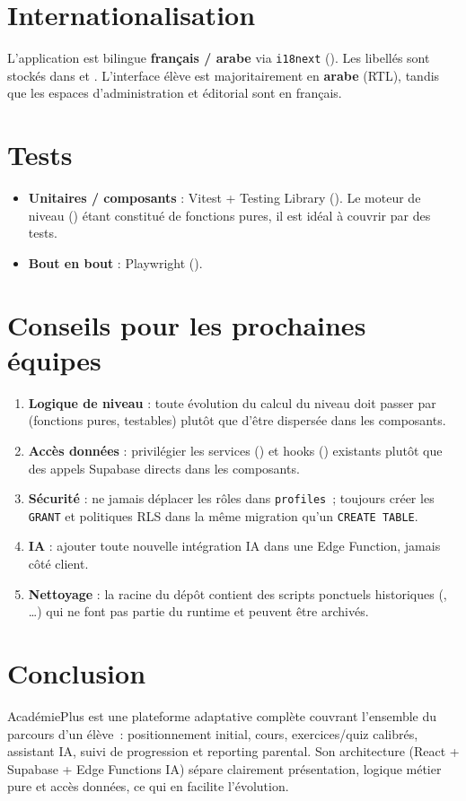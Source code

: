 \section{Internationalisation}
L'application est bilingue \textbf{français / arabe} via \texttt{i18next}
(). Les libellés sont stockés dans
 et .
L'interface élève est majoritairement en \textbf{arabe} (RTL), tandis que les
espaces d'administration et éditorial sont en français.

\section{Tests}
\begin{itemize}
  \item \textbf{Unitaires / composants} : Vitest + Testing Library
        (). Le moteur de niveau ()
        étant constitué de fonctions pures, il est idéal à couvrir par des tests.
  \item \textbf{Bout en bout} : Playwright ().
\end{itemize}

\section{Conseils pour les prochaines équipes}
\begin{enumerate}
  \item \textbf{Logique de niveau} : toute évolution du calcul du niveau doit
        passer par  (fonctions pures, testables)
        plutôt que d'être dispersée dans les composants.
  \item \textbf{Accès données} : privilégier les services ()
        et hooks () existants plutôt que des appels Supabase
        directs dans les composants.
  \item \textbf{Sécurité} : ne jamais déplacer les rôles dans \texttt{profiles}~;
        toujours créer les \texttt{GRANT} et politiques RLS dans la même migration
        qu'un \texttt{CREATE TABLE}.
  \item \textbf{IA} : ajouter toute nouvelle intégration IA dans une Edge Function,
        jamais côté client.
  \item \textbf{Nettoyage} : la racine du dépôt contient des scripts ponctuels
        historiques (, \dots) qui ne font
        pas partie du runtime et peuvent être archivés.
\end{enumerate}

\section*{Conclusion}
AcadémiePlus est une plateforme adaptative complète couvrant l'ensemble du
parcours d'un élève~: positionnement initial, cours, exercices/quiz calibrés,
assistant IA, suivi de progression et reporting parental. Son architecture
(React + Supabase + Edge Functions IA) sépare clairement présentation, logique
métier pure et accès données, ce qui en facilite l'évolution.

